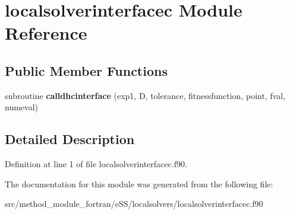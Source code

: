 \hypertarget{classlocalsolverinterfacec}{\section{localsolverinterfacec Module Reference}
\label{classlocalsolverinterfacec}
}
\subsection*{Public Member Functions}
\begin{DoxyCompactItemize}
\item 
\hypertarget{classlocalsolverinterfacec_a3a9a4c04087c9cafc4e94eca821c3fa0}{subroutine {\bfseries calldhcinterface} (exp1, D, tolerance, fitnessfunction, point, fval, numeval)}\label{classlocalsolverinterfacec_a3a9a4c04087c9cafc4e94eca821c3fa0}

\end{DoxyCompactItemize}


\subsection{Detailed Description}


Definition at line 1 of file localsolverinterfacec.\-f90.



The documentation for this module was generated from the following file\-:\begin{DoxyCompactItemize}
\item 
src/method\-\_\-module\-\_\-fortran/e\-S\-S/localsolvers/localsolverinterfacec.\-f90\end{DoxyCompactItemize}
